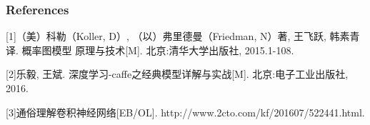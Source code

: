 \documentclass{article} %
\begin{document}
\begin{CJK*}{UTF8}{gkai}
\subsubsection*{References}

\small{
[1]（美）科勒（Koller, D）, （以）弗里德曼（Friedman, N）著, 王飞跃, 韩素青译. 概率图模型 原理与技术[M]. 北京:清华大学出版社, 2015.1-108.

[2]乐毅, 王斌. 深度学习-caffe之经典模型详解与实战[M]. 北京:电子工业出版社, 2016.

[3]通俗理解卷积神经网络[EB/OL]. http://www.2cto.com/kf/201607/522441.html.

}
\end{CJK*}
\end{document}
